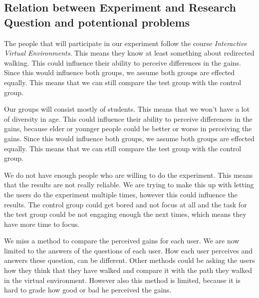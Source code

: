 \subsection{Relation between Experiment and Research Question and potentional problems}\label{sec:rel}
The people that will participate in our experiment follow the course \emph{Interactive Virtual Environments}.
This means they know at least something about redirected walking.
This could influence their ability to perceive differences in the gains.
Since this would influence both groups, we assume both groups are effected equally.
This means that we can still compare the test group with the control group.

Our groups will consist mostly of students.
This means that we won't have a lot of diversity in age.
This could influence their ability to perceive differences in the gains, because elder or younger people could be better or worse in perceiving the gains.
Since this would influence both groups, we assume both groups are effected equally.
This means that we can still compare the test group with the control group.

We do not have enough people who are willing to do the experiment.
This means that the results are not really reliable.
We are trying to make this up with letting the users do the experiment multiple times, however this could influence the results.
The control group could get bored and not focus at all and the task for the test group could be not engaging enough the next times, which means they have more time to focus.

We miss a method to compare the perceived gains for each user.
We are now limited to the answers of the questions of each user.
How each user perceives and answers these question, can be different.
Other methods could be asking the users how they think that they have walked and compare it with the path they walked in the virtual environment.
However also this method is limited, because it is hard to grade how good or bad he perceived the gains.

